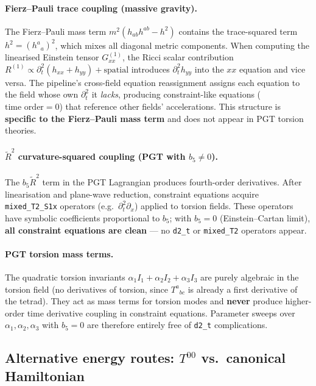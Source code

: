 \paragraph{Fierz--Pauli trace coupling (massive gravity).}
The Fierz--Pauli mass term $m^2(h_{ab}h^{ab} - h^2)$ contains the
trace-squared term $h^2 = (h^a{}_a)^2$, which mixes all diagonal metric
components.  When computing the linearised Einstein tensor $G^{(1)}_{xx}$,
the Ricci scalar contribution $R^{(1)} \propto \partial^2_t(h_{xx} + h_{yy})
+ \text{spatial}$ introduces $\partial^2_t h_{yy}$ into the $xx$ equation
and vice versa.  The pipeline's cross-field equation reassignment assigns each
equation to the field whose own $\partial^2_t$ it \emph{lacks}, producing
constraint-like equations ($\text{time order} = 0$) that reference other
fields' accelerations.  This structure is \textbf{specific to the Fierz--Pauli
mass term} and does not appear in PGT torsion theories.

\paragraph{$\tilde{R}^2$ curvature-squared coupling (PGT with $b_5 \neq 0$).}
The $b_5 \tilde{R}^2$ term in the PGT Lagrangian produces fourth-order
derivatives.  After linearisation and plane-wave reduction, constraint
equations acquire \texttt{mixed\_T2\_S1x} operators (e.g.\
$\partial^2_t \partial_x$) applied to torsion fields.  These operators
have symbolic coefficients proportional to $b_5$; with $b_5 = 0$
(Einstein--Cartan limit), \textbf{all constraint equations are clean} ---
no \texttt{d2\_t} or \texttt{mixed\_T2} operators appear.

\paragraph{PGT torsion mass terms.}
The quadratic torsion invariants $\alpha_1 I_1 + \alpha_2 I_2 + \alpha_3 I_3$
are purely algebraic in the torsion field (no derivatives of torsion, since
$T^a{}_{bc}$ is already a first derivative of the tetrad).  They act as mass
terms for torsion modes and \textbf{never} produce higher-order time
derivative coupling in constraint equations.  Parameter sweeps over
$\alpha_1, \alpha_2, \alpha_3$ with $b_5 = 0$ are therefore entirely free
of \texttt{d2\_t} complications.

\subsection{Alternative energy routes: $T^{00}$ vs.\ canonical Hamiltonian}
\label{sec:cf-t00}


